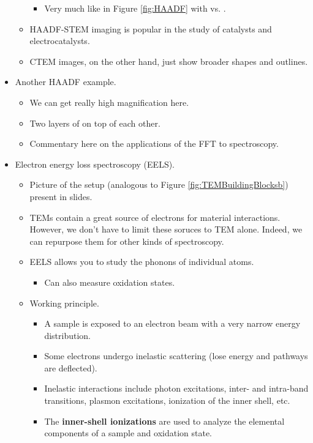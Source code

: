 \documentclass[../notes.tex]{subfiles}
\begin{document}
\begin{itemize}
\begin{itemize}
\begin{itemize}
            \item Very much like in Figure \ref{fig:HAADF} with  vs. .
        \end{itemize}
        \item HAADF-STEM imaging is popular in the study of catalysts and electrocatalysts.
        \item CTEM images, on the other hand, just show broader shapes and outlines.
    \end{itemize}
    \item Another HAADF example.
    \begin{itemize}
        \item We can get really high magnification here.
        \item Two layers of  on top of each other.
        \item Commentary here on the applications of the FFT to spectroscopy.
    \end{itemize}
    \item Electron energy loss spectroscopy (EELS).
    \begin{itemize}
        \item Picture of the setup (analogous to Figure \ref{fig:TEMBuildingBlocksb}) present in slides.
        \item TEMs contain a great source of electrons for material interactions. However, we don't have to limit these soruces to TEM alone. Indeed, we can repurpose them for other kinds of spectroscopy.
        \item EELS allows you to study the phonons of individual atoms.
        \begin{itemize}
            \item Can also measure oxidation states.
        \end{itemize}
        \item Working principle.
        \begin{itemize}
            \item A sample is exposed to an electron beam with a very narrow energy distribution.
            \item Some electrons undergo inelastic scattering (lose energy and pathways are deflected).
            \item Inelastic interactions include photon excitations, inter- and intra-band transitions, plasmon excitations, ionization of the inner shell, etc.
            \item The \textbf{inner-shell ionizations} are used to analyze the elemental components of a sample and oxidation state.

\end{itemize}
\end{itemize}
\end{itemize}
\end{document}
